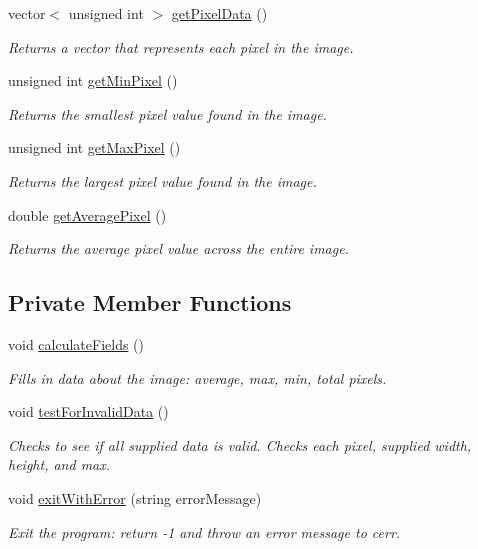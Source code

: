 \begin{DoxyCompactItemize}
vector$<$ unsigned int $>$ \hyperlink{class_p_g_m_a877528d7f9ddfca9feea1cb10f748688}{get\+Pixel\+Data} ()
\begin{DoxyCompactList}\small\item\em Returns a vector that represents each pixel in the image. \end{DoxyCompactList}\item 
unsigned int \hyperlink{class_p_g_m_aa49fefcbaf761e0c47780d6beda4bff7}{get\+Min\+Pixel} ()
\begin{DoxyCompactList}\small\item\em Returns the smallest pixel value found in the image. \end{DoxyCompactList}\item 
unsigned int \hyperlink{class_p_g_m_a73122b56f85bafab9dde92e12cc2c7b9}{get\+Max\+Pixel} ()
\begin{DoxyCompactList}\small\item\em Returns the largest pixel value found in the image. \end{DoxyCompactList}\item 
double \hyperlink{class_p_g_m_af9ee26b93c22b57c2b36c7712e6197d5}{get\+Average\+Pixel} ()
\begin{DoxyCompactList}\small\item\em Returns the average pixel value across the entire image. \end{DoxyCompactList}\end{DoxyCompactItemize}
\subsection*{Private Member Functions}
\begin{DoxyCompactItemize}
\item 
void \hyperlink{class_p_g_m_a0f4d662e567907ea2c9cffe52afa61ad}{calculate\+Fields} ()
\begin{DoxyCompactList}\small\item\em Fills in data about the image\+: average, max, min, total pixels. \end{DoxyCompactList}\item 
void \hyperlink{class_p_g_m_a1bae23f542fd94295967b63333417ece}{test\+For\+Invalid\+Data} ()
\begin{DoxyCompactList}\small\item\em Checks to see if all supplied data is valid. Checks each pixel, supplied width, height, and max. \end{DoxyCompactList}\item 
void \hyperlink{class_p_g_m_a586ac54af66abae83705beafb4bbada0}{exit\+With\+Error} (string error\+Message)
\begin{DoxyCompactList}\small\item\em Exit the program\+: return -\/1 and throw an error message to cerr. \end{DoxyCompactList}\end{DoxyCompactItemize}
